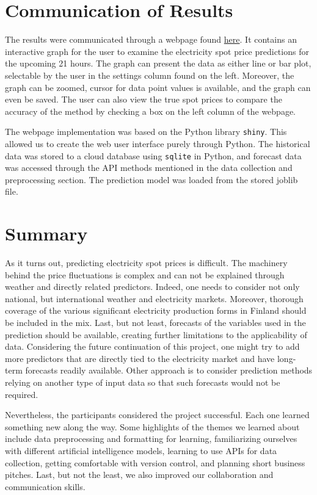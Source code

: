 \documentclass{article}
\numberwithin{equation}{section}
\begin{document}
\section{Communication of Results}
The results were communicated through a webpage found \href{https://connect.posit.cloud/AhsanAbbas101/content/0192c52c-7101-3655-bc34-0e4733cd46de}{here}. It contains an interactive graph for the user to examine the electricity spot price predictions for the upcoming 21 hours. The graph can present the data as either line or bar plot, selectable by the user in the settings column found on the left. Moreover, the graph can be zoomed, cursor for data point values is available, and the graph can even be saved. The user can also view the true spot prices to compare the accuracy of the method by checking a box on the left column of the webpage. 

The webpage implementation was based on the Python library \verb|shiny|. This allowed us to create the web user interface purely through Python. The historical data was stored to a cloud database using \verb|sqlite| in Python, and forecast data was accessed through the API methods mentioned in the data collection and preprocessing section. The prediction model was loaded from the stored joblib file.


\section{Summary}
As it turns out, predicting electricity spot prices is difficult. The machinery behind the price fluctuations is complex and can not be explained through weather and directly related predictors. Indeed, one needs to consider not only national, but international weather and electricity markets. Moreover, thorough coverage of the various significant electricity production forms in Finland should be included in the mix. Last, but not least, forecasts of the variables used in the prediction should be available, creating further limitations to the applicability of data. Considering the future continuation of this project, one might try to add more predictors that are directly tied to the electricity market and have long-term forecasts readily available. Other approach is to consider prediction methods relying on another type of input data so that such forecasts would not be required.

Nevertheless, the participants considered the project successful. Each one learned something new along the way. Some highlights of the themes we learned about include data preprocessing and formatting for learning, familiarizing ourselves with different artificial intelligence models, learning to use APIs for data collection, getting comfortable with version control, and planning short business pitches. Last, but not the least, we also improved our collaboration and communication skills.

\end{document}

